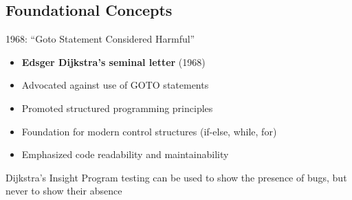 \documentclass{beamer}
\begin{document}
\subsection{Foundational Concepts}

\begin{frame}[t]{1968: ``Goto Statement Considered Harmful''}
\begin{itemize}
    \item \textbf{Edsger Dijkstra's seminal letter} (1968)
    \item Advocated against use of GOTO statements
    \item Promoted structured programming principles
    \item Foundation for modern control structures (if-else, while, for)
    \item Emphasized code readability and maintainability
\end{itemize}
\begin{block}{Dijkstra's Insight}
Program testing can be used to show the presence of bugs, but never to show their absence
\end{block}
\end{frame}
\end{document}
